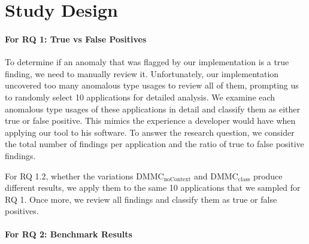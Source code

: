 \section{Study Design}


\paragraph{For RQ 1: True vs False Positives}

To determine if an anomaly that was flagged by our implementation is a true finding, we need to manually review it.
Unfortunately, our implementation uncovered too many anomalous type usages to review all of them, prompting us to randomly select 10 applications for detailed analysis.
We examine each anomalous type usages of these applications in detail and classify them as either true or false positive.
This mimics the experience a developer would have when applying our tool to his software.
To answer the research question, we consider the total number of findings per application and the ratio of true to false positive findings.

For RQ 1.2, whether the variations $\text{DMMC}_\text{noContext}$ and $\text{DMMC}_\text{class}$ produce different results, we apply them to the same 10 applications that we sampled for RQ 1.
Once more, we review all findings and classify them as true or false positives.

\paragraph{For RQ 2: Benchmark Results}

